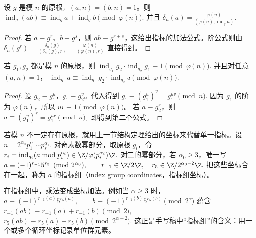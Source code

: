 \begin{proposition}[指标的基本性质]
设 $g$ 是模 $n$ 的原根，$(a,n)=(b,n)=1$。则
\(
  \operatorname{ind}_g(ab)
  \equiv
  \operatorname{ind}_g a+\operatorname{ind}_g b
  \pmod{\varphi(n)}.
\)
并且
\(
  \delta_n(a)
  =
  \frac{\varphi(n)}
  {(\varphi(n),\operatorname{ind}_g a)}.
\)
\end{proposition}

\begin{proof}
若 $a\equiv g^r$、$b\equiv g^s$，则 $ab\equiv g^{r+s}$，这给出指标的加法公式。阶公式则由
\(
  \delta_n(g^r)=\frac{\delta_n(g)}{(\delta_n(g),r)}
  =
  \frac{\varphi(n)}{(\varphi(n),r)}
\)
直接得到。
\end{proof}

\begin{proposition}[换底公式]
若 $g_1,g_2$ 都是模 $n$ 的原根，则
\(
  \operatorname{ind}_{g_1}g_2\cdot \operatorname{ind}_{g_2}g_1
  \equiv 1\pmod{\varphi(n)}.
\)
并且对任意 $(a,n)=1$，
\(
  \operatorname{ind}_{g_1}a
  \equiv
  \operatorname{ind}_{g_1}g_2\cdot \operatorname{ind}_{g_2}a
  \pmod{\varphi(n)}.
\)
\end{proposition}

\begin{proof}
设 $g_2\equiv g_1^u$，$g_1\equiv g_2^v$。代入得到
\(
  g_1\equiv (g_1^u)^v=g_1^{uv}\pmod n.
\)
因为 $g_1$ 的阶为 $\varphi(n)$，所以 $uv\equiv1\pmod{\varphi(n)}$。
若 $a\equiv g_2^r$，则
\(
  a\equiv (g_1^u)^r=g_1^{ur}\pmod n,
\)
即得到第二个公式。
\end{proof}

\begin{definition}[指标组]
若模 $n$ 不一定存在原根，就用上一节结构定理给出的坐标来代替单一指标。设
\(
  n=2^{\alpha_0}p_1^{\alpha_1}\cdots p_s^{\alpha_s}.
\)
对奇素数幂部分，取原根 $g_i$，令
\(
  r_i=\operatorname{ind}_{g_i}(a\bmod p_i^{\alpha_i})
  \in \Cyc{\varphi(p_i^{\alpha_i})}.
\)
对二的幂部分，若 $\alpha_0\ge3$，唯一写
\(
  a\equiv (-1)^{r_{-1}}5^{r_5}\pmod {2^{\alpha_0}},
  \qquad
  r_{-1}\in\Cyc2,\quad r_5\in \Cyc{2^{\alpha_0-2}}.
\)
把这些坐标合在一起，称为 $a$ 的指标组（index group coordinates，指标组坐标）。
\end{definition}

在指标组中，乘法变成坐标加法。例如当 $\alpha\ge3$ 时，
\(
  a\equiv (-1)^{r_{-1}(a)}5^{r_5(a)},\qquad
  b\equiv (-1)^{r_{-1}(b)}5^{r_5(b)}
  \pmod {2^\alpha}
\)
蕴含
\(
  r_{-1}(ab)\equiv r_{-1}(a)+r_{-1}(b)\pmod 2,
\)
\(
  r_5(ab)\equiv r_5(a)+r_5(b)\pmod {2^{\alpha-2}}.
\)
这正是手写稿中“指标组”的含义：用一个或多个循环坐标记录单位群元素。

